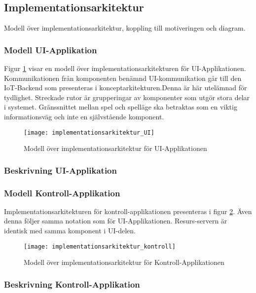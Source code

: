 \subsection{Implementationsarkitektur}
Modell över implementationsarkitektur, koppling till motiveringen och diagram.

\subsubsection{Modell UI-Applikation}
Figur \ref{fig:implementationsarkitektur-UI} visar en modell över implementationsarkitekturen för UI-Applikationen. Kommunikationen från komponenten benämnd UI-kommunikation går till den IoT-Backend som presenteras i konceptarkitekturen.Denna är här utelämnad för tydlighet. Streckade rutor är grupperingar av komponenter som utgör stora delar i systemet. Gränssnittet mellan spel och spelläge ska betraktas som en viktig informationsväg och inte en självstående komponent.

\begin{figure}[h]
    \centering
    \texttt{[image: implementationsarkitektur\_UI]}
    \caption{Modell över implementationsarkitektur för UI-Applikationen}
    \label{fig:implementationsarkitektur-UI}
\end{figure}

\subsubsection{Beskrivning UI-Applikation}

\subsubsection{Modell Kontroll-Applikation}
Implementationsarkitekturen för kontroll-applikationen presenteras i figur \ref{fig:implementationsarkitektur-kontroll}. Även denna följer samma notation som för UI-Applikationen. Resurs-servern är identisk med samma komponent i UI-delen.

\begin{figure}[h]
    \centering
    \texttt{[image: implementationsarkitektur\_kontroll]}
    \caption{Modell över implementationsarkitektur för Kontroll-Applikationen}
    \label{fig:implementationsarkitektur-kontroll}
\end{figure}

\subsubsection{Beskrivning Kontroll-Applikation}
